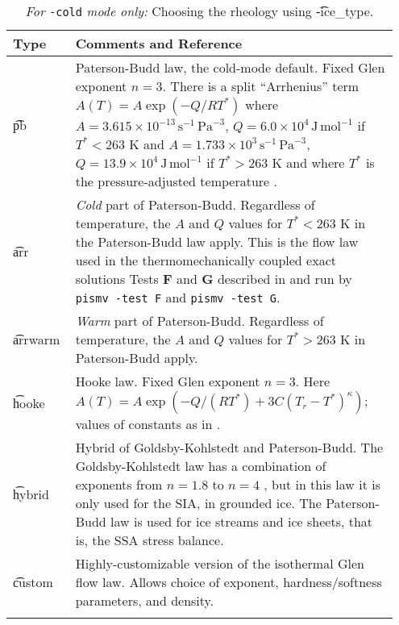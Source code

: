 \begin{table}[ht]
\centering
\caption{\emph{For} \texttt{-cold} \emph{mode only:} Choosing the rheology using \t{-ice_type}.}\label{tab:flowlaw}
\small
\begin{tabular}{p{0.15\linewidth}p{0.8\linewidth}}\toprule
\textbf{Type} & \textbf{Comments and Reference} \\ \midrule
\t{pb} &  Paterson-Budd law, the cold-mode default.  Fixed Glen exponent $n=3$.  There is a split ``Arrhenius'' term $A(T) = A \exp(-Q/RT^*)$ where \mbox{$A = 3.615 \times 10^{-13}\, \text{s}^{-1}\, \text{Pa}^{-3}$}, \mbox{$Q = 6.0 \times 10^4\, \text{J}\, \text{mol}^{-1}$} if $T^* < 263$ K and
 \mbox{$A = 1.733 \times 10^{3}\, \text{s}^{-1}\, \text{Pa}^{-3}$}, \mbox{$Q = 13.9 \times 10^4\, \text{J}\, \text{mol}^{-1}$} if $T^* > 263$ K and where $T^*$ is the pressure-adjusted temperature \cite{PatersonBudd}. \\
\t{arr} &  \emph{Cold} part of Paterson-Budd.  Regardless of temperature, the $A$ and $Q$ values for $T^*<263$ K in  the Paterson-Budd law apply.  This is the flow law used in the thermomechanically coupled exact solutions Tests \textbf{F} and \textbf{G} described in \cite{BBL,BB} and run by \texttt{pismv -test F} and \texttt{pismv -test G}. \\
\t{arrwarm} & \emph{Warm} part of Paterson-Budd.  Regardless of temperature, the $A$ and $Q$ values for $T^*>263$ K in Paterson-Budd apply.\\
\t{hooke} & Hooke law.  Fixed Glen exponent $n=3$.  Here  $A(T) = A \exp(-Q/(RT^*) + 3C (T_r - T^*)^\kappa)$; values of  constants as in \cite{Hooke,PayneBaldwin}.\\
\t{hybrid} &  Hybrid of Goldsby-Kohlstedt and Paterson-Budd.  The Goldsby-Kohlstedt law has a combination of exponents  from $n=1.8$ to $n=4$ \cite{GoldsbyKohlstedt}, but in this law it is only used for the SIA, in grounded ice.  The Paterson-Budd law is used for ice streams and ice sheets, that is, the SSA stress balance. \\
\t{custom} & Highly-customizable version of the isothermal Glen flow law.  Allows choice of exponent, hardness/softness parameters, and density. \\
\bottomrule
\normalsize	
\end{tabular}
\end{table}

